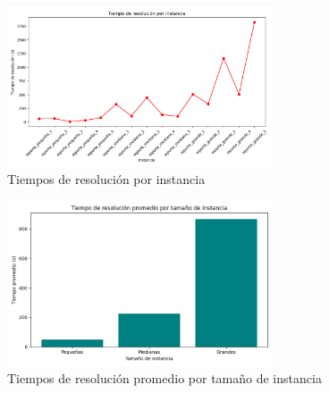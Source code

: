 \begin{figure}[H]
\centering
\includegraphics[width=0.7\textwidth]{tiempos_resolucion.png}
\caption{Tiempos de resolución por instancia}
\end{figure}

\begin{figure}[H]
\centering
\includegraphics[width=0.7\textwidth]{tiempos_resolucion_promedio.png}
\caption{Tiempos de resolución promedio por tamaño de instancia}
\end{figure}

